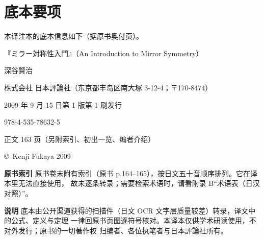\chapter*{底本要项}

本译注本的底本信息如下（据原书奥付页）。

\begin{description}[leftmargin=5em,itemsep=4pt,style=nextline]
  \item[书名] 『ミラー対称性入門』（An Introduction to Mirror Symmetry）
  \item[编者] 深谷賢治
  \item[发行所] 株式会社 日本評論社（东京都丰岛区南大塚 3-12-4；〒170-8474）
  \item[版次] 2009 年 9 月 15 日\quad 第 1 版第 1 刷发行
  \item[ISBN] 978-4-535-78632-5
  \item[页数] 正文 163 页（另附索引、初出一览、编者介绍）
  \item[著作权] \copyright\ Kenji Fukaya 2009
\end{description}

\medskip
\noindent\textbf{原书索引}\quad
原书卷末附有索引（原书 p.164--165），按日文五十音顺序排列。它在译本里无法直接使用，
故未逐条转录；需要检索术语时，请看附录 B“术语表（日汉对照）”。

\medskip
\noindent\textbf{说明}\quad
底本由公开渠道获得的扫描件（日文 OCR 文字层质量较差）转录，译文中的公式、定义与定理
一律回原书页图逐符号核对。本译本仅供学术研读使用，不对外发行；原书的一切著作权
归编者、各位执笔者与日本評論社所有。

